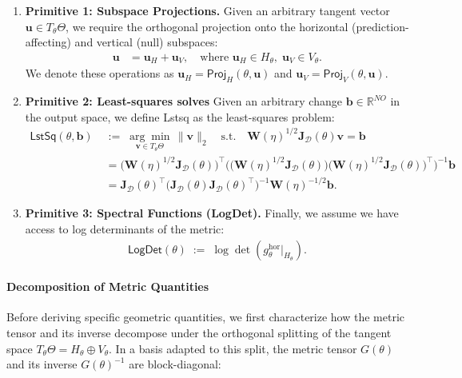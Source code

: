 \begin{enumerate}
    \item \textbf{Primitive 1: Subspace Projections.}
    Given an arbitrary tangent vector $\mathbf{u} \in T_\theta \Theta$, we require the orthogonal projection onto the horizontal (prediction-affecting) and vertical (null) subspaces:
    \begin{align}
        \mathbf{u} &= \mathbf{u}_H + \mathbf{u}_V, \quad \text{where } \mathbf{u}_H \in H_\theta, \; \mathbf{u}_V \in V_\theta.
    \end{align}
    We denote these operations as $\mathbf{u}_H = \textsf{Proj}_H(\theta, \mathbf{u})$ and $\mathbf{u}_V = \textsf{Proj}_V(\theta, \mathbf{u})$.

    \item \textbf{Primitive 2: Least-squares solves}
    Given an arbitrary change $\mathbf{b} \in \mathbb{R}^{NO}$ in the output space, we define \textsf{Lstsq} as the least-squares problem:
    \begin{align}
    \label{eq:constr_lsq_param}
        \textsf{LstSq}(\theta, \mathbf{b}) \;&:=\;  \underset{\mathbf{v} \in T_\theta \Theta}{\arg\min} \, \|\mathbf{v}\|_2 \quad \text{s.t.} \quad \mathbf{W}(\eta)^{1/2}\mathbf{J}_\mathcal{D}(\theta)\mathbf{v} = \mathbf{b} \\
        &= \big(\mathbf{W}(\eta)^{1/2}\mathbf{J}_\mathcal{D}(\theta)\big)^\top \Big( \big(\mathbf{W}(\eta)^{1/2}\mathbf{J}_\mathcal{D}(\theta)\big) \big(\mathbf{W}(\eta)^{1/2}\mathbf{J}_\mathcal{D}(\theta)\big)^\top \Big)^{-1} \mathbf{b} \nonumber \\
        &= \mathbf{J}_\mathcal{D}(\theta)^\top \big(\mathbf{J}_\mathcal{D}(\theta)\mathbf{J}_\mathcal{D}(\theta)^\top\big)^{-1} \mathbf{W}(\eta)^{-1/2} \mathbf{b}. \nonumber
    \end{align}

    \item \textbf{Primitive 3: Spectral Functions (LogDet).}
    Finally, we assume we have access to log determinants of the metric:
    \begin{align}
        \textsf{LogDet}(\theta) \;:=\; \log\det\!\left(g^{\mathrm{hor}}_\theta|_{H_\theta}\right).
    \end{align}
\end{enumerate}

\paragraph{Decomposition of Metric Quantities}
Before deriving specific geometric quantities, we first characterize how the metric tensor and its inverse decompose under the orthogonal splitting of the tangent space $T_\theta \Theta = H_\theta \oplus V_\theta$. In a basis adapted to this split, the metric tensor $G(\theta)$ and its inverse $G(\theta)^{-1}$ are block-diagonal:

